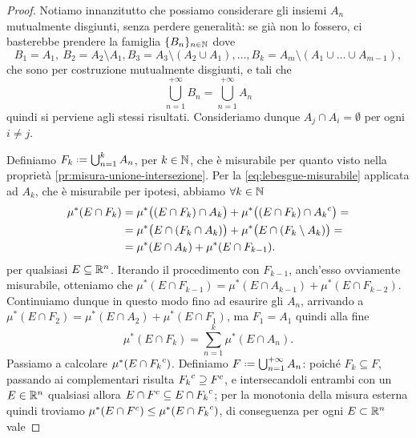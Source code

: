 \begin{proof}
	Notiamo innanzitutto che possiamo considerare gli insiemi $A_n$ mutualmente disgiunti, senza perdere generalità: se già non lo fossero, ci basterebbe prendere la famiglia $\{B_n\}_{n\in\mathbb{N}}$ dove
	\begin{equation}
		B_1=A_1,\ B_2=A_2\setminus A_1, B_3=A_3\setminus(A_2\cup A_1),\dots,B_k=A_m\setminus(A_1\cup\dots\cup A_{m-1}),
	\end{equation}
	che sono per costruzione mutualmente disgiunti, e tali che
	\begin{equation}
		\bigcup_{n=1}^{+\infty}B_n=\bigcup_{n=1}^{+\infty}A_n
	\end{equation}
	quindi si perviene agli stessi risultati.
	Consideriamo dunque $A_j\cap A_i=\emptyset$ per ogni $i\neq j$.

	Definiamo $F_k\defeq\bigcup_{n=1}^kA_n$, per $k\in\mathbb{N}$, che è misurabile per quanto visto nella proprietà \ref{pr:misura-unione-intersezione}.
	Per la \eqref{eq:lebesgue-misurabile} applicata ad $A_k$, che è misurabile per ipotesi, abbiamo $\forall k\in\mathbb{N}$
	\begin{equation}
		\begin{split}
			\mu^*(E\cap F_k)&=\mu^*\big( (E\cap F_k)\cap A_k\big)+\mu^*\big( (E\cap F_k)\cap{A_k}^c\big)=\\
			&=\mu^*\big(E\cap(F_k\cap A_k)\big)+\mu^*\big(E\cap (F_k\setminus A_k)\big)=\\
			&=\mu^*(E\cap A_k)+\mu^*(E\cap F_{k-1}).
		\end{split}
	\end{equation}
	per qualsiasi $E\subseteq\mathbb{R}^n$.
	Iterando il procedimento con $F_{k-1}$, anch'esso ovviamente misurabile, otteniamo che $\mu^*(E\cap F_{k-1})=\mu^*(E\cap A_{k-1})+\mu^*(E\cap F_{k-2})$.
	Continuiamo dunque in questo modo fino ad esaurire gli $A_n$, arrivando a $\mu^*(E\cap F_2)=\mu^*(E\cap A_2)+\mu^*(E\cap F_1)$, ma $F_1=A_1$ quindi alla fine
	\begin{equation}
		\mu^*(E\cap F_k)=\sum_{n=1}^k\mu^*(E\cap A_n).
	\end{equation}
	Passiamo a calcolare $\mu^*(E\cap{F_k}^c)$.
	Definiamo $F\defeq\bigcup_{n=1}^{+\infty}A_n$: poich\'e $F_k\subseteq F$, passando ai complementari risulta ${F_k}^c\supseteq{F}^c$, e intersecandoli entrambi con un $E\in\mathbb{R}^n$ qualsiasi allora $E\cap{F}^c\subseteq E\cap{F_k}^c$; per la monotonia della misura esterna quindi troviamo $\mu^*(E\cap{F}^c)\leq\mu^*(E\cap{F_k}^c)$, di conseguenza per ogni $E\subset\mathbb{R}^n$ vale

\end{proof}
